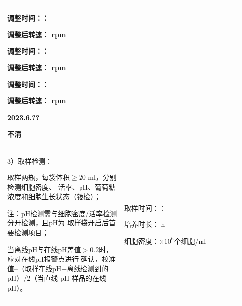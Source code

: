 \documentclass[UTF8,10pt,a4paper,fontset=fandol]{ctexart}
\newcommand{\handwritten}[1]{#1}
\begin{document}
\begin{tabular}{|p{0.47\linewidth}|p{0.47\linewidth}|}
\begin{minipage}[t]{\linewidth}
调整时间：\underline{\hspace{0.55in}}：\underline{\hspace{0.55in}}

调整后转速：\underline{\hspace{0.55in}} rpm

\vspace{4pt}

调整时间：\underline{\hspace{0.55in}}：\underline{\hspace{0.55in}}

调整后转速：\underline{\hspace{0.55in}} rpm

\vspace{4pt}

调整时间：\underline{\hspace{0.55in}}：\underline{\hspace{0.55in}}

调整后转速：\underline{\hspace{0.55in}} rpm

\vspace{3pt}
\handwritten{2023.6.??}

\handwritten{不清}
\end{minipage}
\\ \hline

\begin{minipage}[t]{\linewidth}
3）取样检测：

取样两瓶，每袋体积$\geq20$ ml，分别检测细胞密度、
活率、pH、葡萄糖浓度和细胞生长状态（镜检）；

注：pH检测需与细胞密度/活率检测分开检测，且pH为
取样袋开启后首要检测项目；

当离线pH与在线pH差值$>0.2$时，应对在线pH报警点进行
确认，校准值--（取样在线pH+离线检测到的pH）/2（当直线
pH-样品的在线pH）。
\end{minipage}
&
\begin{minipage}[t]{\linewidth}
取样时间：\underline{\hspace{0.55in}}：\underline{\hspace{0.55in}}

培养时长：\underline{\hspace{0.55in}} h

细胞密度：\underline{\hspace{0.55in}}$\times10^{6}$个细胞/ml


\end{minipage}
\end{tabular}
\end{document}
